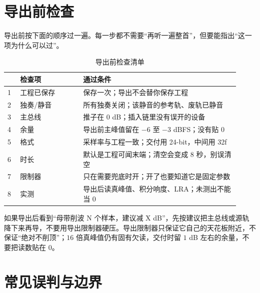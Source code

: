 \section{导出前检查}

导出前按下面的顺序过一遍。每一步都不需要“再听一遍整首”，但要能指出“这一项为什么可以过”。

\begin{table}[htbp]
\centering
\small
\begin{tabular}{@{}p{0.05\linewidth}p{0.25\linewidth}p{0.62\linewidth}@{}}
\hline
 & 检查项 & 通过条件 \\
\hline
1 & 工程已保存 & 保存一次；导出不会替你保存工程 \\
2 & 独奏/静音 & 所有独奏关闭；该静音的参考轨、废轨已静音 \\
3 & 主总线 & 推子在 $0$ dB；插入链里没有误开的设备 \\
4 & 余量 & 导出前主峰值留在 $-6$ 至 $-3$ dBFS；没有贴 $0$ \\
5 & 格式 & 采样率与工程一致；交付用 24-bit，中间用 32f \\
6 & 时长 & 默认是工程可闻末端；清空会变成 8 秒，别误清空 \\
7 & 限制器 & 只在需要兜底时开；开了也要知道它是固定参数 \\
8 & 实测 & 导出后读真峰值、积分响度、LRA；未测出不能当 0 \\
\hline
\end{tabular}
\caption{导出前检查清单}
\label{tab:walk-export-check}
\end{table}

如果导出后看到“母带削波 N 个样本，建议减 X dB”，先按建议把主总线或源轨降下来再导，不要用导出限制器硬压。导出限制器只保证它自己的天花板附近，不保证“绝对不削顶”；$16$ 倍真峰值仍有固有欠读，交付时留 $1$ dB 左右的余量，不要把读数贴在 $0$。

\section{常见误判与边界}

